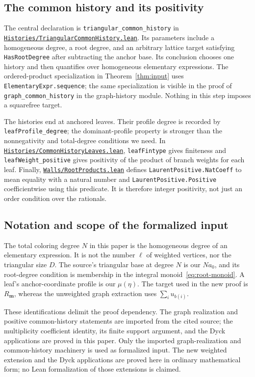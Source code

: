 \documentclass[11pt,reqno]{amsart}
\newcommand{\mm}{\mathbf m}
\newcommand{\sourcefile}[2]{\href{https://github.com/openai/math/blob/fd4aeeb/lean/OAI/Combinatorics/Chromatic/#1}{\nolinkurl{#2}}}
\newcommand{\decl}[1]{\nolinkurl{#1}}
\theoremstyle{definition}
\theoremstyle{remark}
\numberwithin{equation}{section}
\begin{document}
\subsection{The common history and its positivity}
The central declaration is \decl{triangular_common_history} in
\sourcefile{Histories/TriangularCommonHistory.lean}{Histories/TriangularCommonHistory.lean}.
Its parameters include a homogeneous degree, a root degree, and an
arbitrary lattice target satisfying \decl{HasRootDegree} after
subtracting the anchor base.  Its conclusion chooses one history
and then quantifies over homogeneous elementary expressions.
The ordered-product specialization in Theorem~\ref{thm:input} uses
\decl{ElementaryExpr.sequence}; the same specialization is visible
in the proof of \decl{graph_common_history} in the graph-history
module.  Nothing in this step imposes a squarefree target.

The histories end at anchored leaves.  Their profile degree is
recorded by \decl{leafProfile_degree}; the dominant-profile property
is stronger than the nonnegativity and total-degree conditions we
need.  In
\sourcefile{Histories/CommonHistoryLeaves.lean}{Histories/CommonHistoryLeaves.lean},
\decl{leafFintype} gives finiteness and \decl{leafWeight_positive}
gives positivity of the product of branch weights for each leaf.
Finally,
\sourcefile{Walls/RootProducts.lean}{Walls/RootProducts.lean}
defines \decl{LaurentPositive.NatCoeff} to mean equality with a
natural number and \decl{LaurentPositive.Positive} coefficientwise
using this predicate.  It is therefore integer positivity, not just
an order condition over the rationals.

\subsection{Notation and scope of the formalized input}
The total coloring degree $N$ in this paper is the homogeneous degree
of an elementary expression.  It is not the number $\ell$ of weighted
vertices, nor the triangular size $D$.  The source's triangular base
at degree $N$ is our $Na_0$, and its root-degree condition is
membership in the integral monoid~\eqref{eq:root-monoid}.  A leaf's
anchor-coordinate profile is our $\mu(\eta)$.  The target used in the
new proof is $R_{\mm}$, whereas the unweighted graph extraction uses
$\sum_i u_{b(i)}$.

These identifications delimit the proof dependency.  The graph
realization and positive common-history statements are imported from
the cited source; the multiplicity coefficient identity, its finite
support argument, and the Dyck applications are proved in this paper.
Only the imported graph-realization and common-history machinery is
used as formalized input.  The new weighted extension and the Dyck
applications are proved here in ordinary mathematical form; no Lean
formalization of those extensions is claimed.
\end{document}
